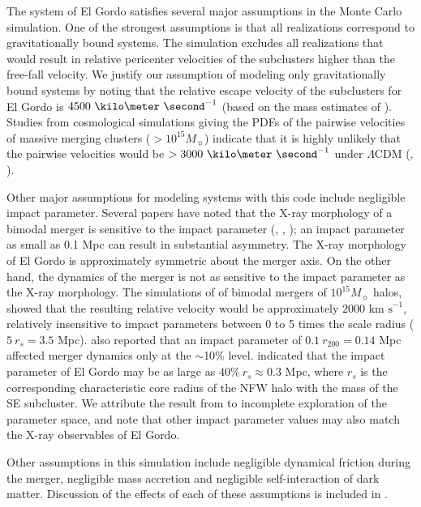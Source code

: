 \documentclass[ucdthesis.tex]{subfiles}
\begin{document}
    The system of El Gordo satisfies several major assumptions in the Monte Carlo
    simulation. One of the strongest assumptions is that all realizations correspond to
    gravitationally bound systems. The simulation excludes all realizations
    that would result in relative pericenter velocities of the subclusters
    higher than the free-fall velocity. We justify our assumption of
    modeling only gravitationally bound systems by noting that the relative escape
    velocity of the subclusters for El Gordo is
    $4500~\kilo\meter~\second^{-1}$ (based on the mass estimates of
    \cite{Jee13}). Studies from cosmological simulations giving the PDFs of the pairwise
    velocities of massive merging clusters ($>10^{15} M_{\sun}$) indicate that it
    is highly unlikely that the pairwise velocities would be $> 3000~\kilo
    \meter~\second^{-1}$ under $\Lambda$CDM (\citealt{Thompson12},
    \citealt{Lee2010}).\par
    Other major assumptions for modeling systems with this code include negligible impact parameter.
    Several papers have noted that the X-ray morphology of a bimodal merger is
    sensitive to the impact parameter (\citealt{Springel2007},
    \citealt{Ricker98}, \citealt{Mastropietro2008a}); an impact
    parameter as small as 0.1 Mpc can result in substantial asymmetry. 
    The X-ray morphology of El Gordo is approximately symmetric about the merger axis. 
    On the other hand, the dynamics of the merger is not as sensitive to the
    impact parameter as the X-ray morphology. The simulations of
    \cite{Ricker98} of bimodal mergers of $10^{15} M_{\sun}$ halos, showed that the
    resulting relative velocity would be approximately $2000 \text{ km s}^{-1}$, relatively
    insensitive to impact parameters between 0 to 5 times the scale radius ($5~r_s = 3.5$ Mpc). \cite{Mastropietro2008a} also reported that
    an impact parameter of $0.1~r_{200} = 0.14$ Mpc affected merger dynamics only
    at the $\sim$10\% level. \citealt{Molnar14} indicated that the impact parameter of El Gordo
    may be as large as $40\%~r_s \approx 0.3$ Mpc, where $r_s$ is
    the corresponding characteristic core
    radius of the NFW halo with the mass of the SE subcluster. We attribute
    the result from \citealt{Molnar14} to incomplete exploration of
    the parameter space, and note that other impact parameter values may also match the
    X-ray observables of El Gordo. \par
    Other assumptions in this simulation include negligible dynamical friction
    during the merger, negligible mass accretion and negligible self-interaction
    of dark matter. Discussion of the effects of each of these assumptions is
    included in .  
\end{document}
